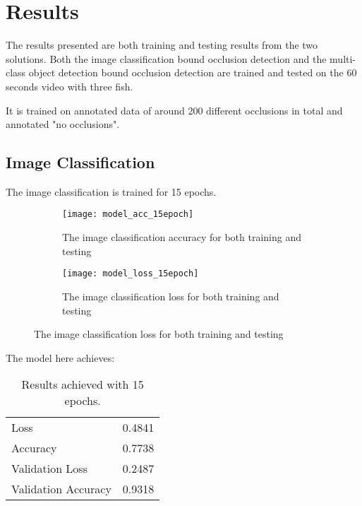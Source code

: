 \graphicspath{{figures/results/}}
\chapter{Results}
The results presented are both training and testing results from the two solutions. Both the image classification bound occlusion detection and the multi-class object detection bound occlusion detection are trained and tested on the 60 seconds video with three fish.

It is trained on annotated data of around 200 different occlusions in total and annotated "no occlusions".
%
\section{Image Classification}
The image classification is trained for 15 epochs.
\begin{figure}[H]
	\centering
	\begin{subfigure}{0.48\textwidth}
		\texttt{[image: model\_acc\_15epoch]}
		\caption{The image classification accuracy for both training and testing}
		\label{fig:img_acc}
	\end{subfigure}
	\begin{subfigure}{0.48\textwidth}
		\texttt{[image: model\_loss\_15epoch]}
		\caption{The image classification loss for both training and testing}
		\label{fig:img_loss}
	\end{subfigure}
\end{figure}
The model here achieves: 
\begin{table}[]
	\centering
	\caption{Results achieved with 15 epochs.}
	\begin{tabular}{|l|l|}
		\hline
		Loss                & 0.4841 \\\rowcolor{lightGrey}\hline
		Accuracy            & 0.7738 \\ \hline
		Validation Loss     & 0.2487 \\\rowcolor{lightGrey}\hline
		Validation Accuracy & 0.9318\\ \hline
	\end{tabular}
\label{tab:img_class_15ep}
\end{table}




